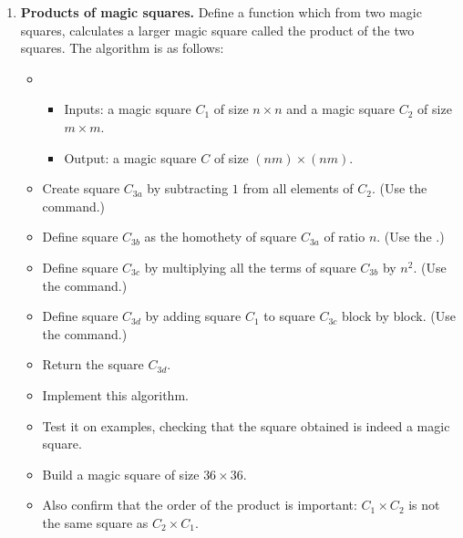 \documentclass[11pt,class=report,crop=false]{standalone}
\begin{document}
\begin{activite}
\begin{enumerate}
 \item \textbf{Products of magic squares.} Define a  function which from two magic squares, calculates a larger magic square called the product of the two squares. The algorithm is as follows:

 \begin{algorithme}
  \sauteligne 
 \begin{itemize}
   \item
   \begin{itemize}
     \item Inputs: a magic square $C_1$ of size $n\times n$ and a magic square $C_2$ of size $m\times m$.
     \item Output: a magic square $C$ of size $(nm)\times(nm)$.
   \end{itemize}

  \item Create square $C_{3a}$ by subtracting $1$ from all elements of $C_2$. (Use the  command.)
  
  \item Define square $C_{3b}$ as the homothety of square $C_{3a}$ of ratio $n$. (Use the .)
  
  \item Define square $C_{3c}$ by multiplying all the terms of square $C_{3b}$ by $n^2$. (Use the  command.)
  
  \item Define square $C_{3d}$ by adding square $C_1$ to square $C_{3c}$  block by block. (Use the  command.)
  
  \item Return the square $C_{3d}$.
   
 \end{itemize}  
 \end{algorithme}
 
 \begin{itemize}
   \item Implement this algorithm. 
   \item Test it on examples, checking that the square obtained is indeed a magic square.
   \item Build a magic square of size $36 \times 36$.
   \item Also confirm that the order of the product is important: $C_1 \times C_2$ is not the same square as $C_2 \times C_1$. 
  \end{itemize}  

\end{enumerate}

\end{activite}
\end{document}
